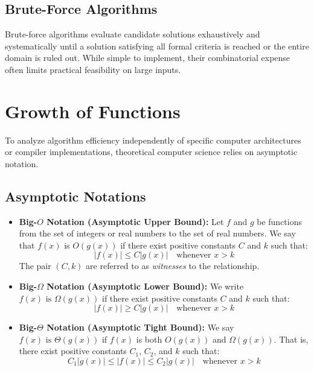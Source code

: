 \documentclass[11pt,a4paper]{article}
\begin{document}
\subsection{Brute-Force Algorithms}
Brute-force algorithms evaluate candidate solutions exhaustively and systematically until a solution satisfying all formal criteria is reached or the entire domain is ruled out. While simple to implement, their combinatorial expense often limits practical feasibility on large inputs.

\section{Growth of Functions}
To analyze algorithm efficiency independently of specific computer architectures or compiler implementations, theoretical computer science relies on asymptotic notation.

\subsection{Asymptotic Notations}
\begin{itemize}
    \item \textbf{Big-$O$ Notation (Asymptotic Upper Bound):} Let $f$ and $g$ be functions from the set of integers or real numbers to the set of real numbers. We say that $f(x)$ is $O(g(x))$ if there exist positive constants $C$ and $k$ such that:
    \begin{equation}
        |f(x)| \le C |g(x)| \quad \text{whenever } x > k
    \end{equation}
    The pair $(C, k)$ are referred to as \emph{witnesses} to the relationship.
    
    \item \textbf{Big-$\Omega$ Notation (Asymptotic Lower Bound):} We write $f(x) \text{ is } \Omega(g(x))$ if there exist positive constants $C$ and $k$ such that:
    \begin{equation}
        |f(x)| \ge C |g(x)| \quad \text{whenever } x > k
    \end{equation}
    
    \item \textbf{Big-$\Theta$ Notation (Asymptotic Tight Bound):} We say $f(x) \text{ is } \Theta(g(x))$ if $f(x)$ is both $O(g(x))$ and $\Omega(g(x))$. That is, there exist positive constants $C_1$, $C_2$, and $k$ such that:
    \begin{equation}
        C_1 |g(x)| \le |f(x)| \le C_2 |g(x)| \quad \text{whenever } x > k
    \end{equation}
\end{itemize}
\end{document}
